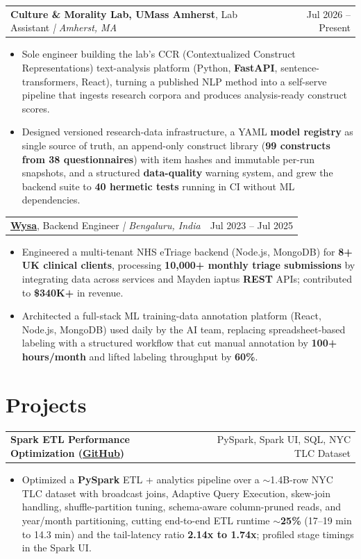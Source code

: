 \documentclass[letterpaper,11pt]{article}
\makeatletter
\newcommand{\expItem}[4]{%
  \vspace{2pt}
  \begin{tabular*}{\textwidth}{@{}l@{\extracolsep{\fill}}r@{}}
    \textbf{#1}, #2 \textit{| #3} & #4 \\
  \end{tabular*}\par\vspace{-3pt}
}
\newcommand{\projItem}[2]{%
  \vspace{2pt}
  \begin{tabular*}{\textwidth}{@{}l@{\extracolsep{\fill}}r@{}}
    \textbf{#1} & #2 \\
  \end{tabular*}\par\vspace{-3pt}
}
\makeatother
\begin{document}
\expItem{Culture \& Morality Lab, UMass Amherst}{Lab Assistant}{Amherst, MA}{Jul 2026 -- Present}
\begin{itemize}
  \item Sole engineer building the lab's CCR (Contextualized Construct Representations) text-analysis platform (Python, \textbf{FastAPI}, sentence-transformers, React), turning a published NLP method into a self-serve pipeline that ingests research corpora and produces analysis-ready construct scores.
  \item Designed versioned research-data infrastructure, a YAML \textbf{model registry} as single source of truth, an append-only construct library (\textbf{99 constructs from 38 questionnaires}) with item hashes and immutable per-run snapshots, and a structured \textbf{data-quality} warning system, and grew the backend suite to \textbf{40 hermetic tests} running in CI without ML dependencies.
\end{itemize}

\expItem{\href{https://www.wysa.io}{Wysa}}{Backend Engineer}{Bengaluru, India}{Jul 2023 -- Jul 2025}
\begin{itemize}
  \item Engineered a multi-tenant NHS eTriage backend (Node.js, MongoDB) for \textbf{8+ UK clinical clients}, processing \textbf{10{,}000+ monthly triage submissions} by integrating data across services and Mayden iaptus \textbf{REST} APIs; contributed to \textbf{\$340K+} in revenue.
  \item Architected a full-stack ML training-data annotation platform (React, Node.js, MongoDB) used daily by the AI team, replacing spreadsheet-based labeling with a structured workflow that cut manual annotation by \textbf{100+ hours/month} and lifted labeling throughput by \textbf{60\%}.
\end{itemize}

\section{Projects}

\projItem{Spark ETL Performance Optimization {\normalfont\small(\href{https://github.com/Deva-1903/Spark-ETL-Optimization}{GitHub})}}{PySpark, Spark UI, SQL, NYC TLC Dataset}
\begin{itemize}
  \item Optimized a \textbf{PySpark} ETL + analytics pipeline over a $\sim$1.4B-row NYC TLC dataset with broadcast joins, Adaptive Query Execution, skew-join handling, shuffle-partition tuning, schema-aware column-pruned reads, and year/month partitioning, cutting end-to-end ETL runtime \textbf{$\sim$25\%} (17--19 min to 14.3 min) and the tail-latency ratio \textbf{2.14x to 1.74x}; profiled stage timings in the Spark UI.
\end{itemize}
\end{document}
